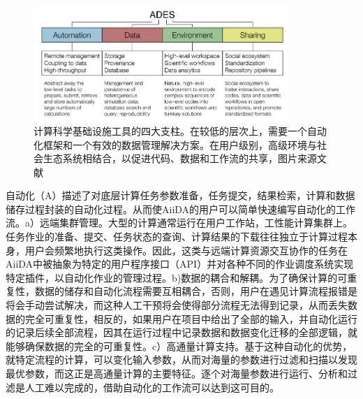 \begin{figure}
  \includegraphics[width=0.86\textwidth]{figs/ch3_ades.png}
  \centering
  \caption{计算科学基础设施工具的四大支柱。在较低的层次上，需要一个自动化框架和一个有效的数据管理解决方案。在用户级别，高级环境与社会生态系统相结合，以促进代码、数据和工作流的共享，图片来源文献\cite{pizzi2016aiida}}
  \label{fig:ch3_ades}
\end{figure}

自动化（A）描述了对底层计算任务参数准备，任务提交，结果检索，计算和数据储存过程封装的自动化过程。从而使AiiDA的用户可以简单快速编写自动化的工作流。a）远端集群管理。大型的计算通常运行在用户工作站，工性能计算集群上。任务作业的准备、提交、任务状态的查询、计算结果的下载往往独立于计算过程本身，用户会频繁地执行这类操作。因此，这类与远端计算资源交互协作的任务在AiiDA中被抽象为特定的用户程序接口（API）并对各种不同的作业调度系统实现特定插件，以自动化作业的管理过程。b)数据的耦合和解耦。为了确保计算的可重复性，数据的储存和自动化流程需要互相耦合，否则，用户在遇见计算流程报错是将会手动尝试解决，而这种人工干预将会使得部分流程无法得到记录，从而丢失数据的完全可重复性，相反的，如果用户在项目中给出了全部的输入，并自动化运行的记录后续全部流程，因其在运行过程中记录数据和数据变化迁移的全部逻辑，就能够确保数据的完全的可重复性。c）高通量计算支持。基于这种自动化的优势，就特定流程的计算，可以变化输入参数，从而对海量的参数进行过滤和扫描以发现最优参数，而这正是高通量计算的主要特征。逐个对海量参数进行运行、分析和过滤是人工难以完成的，借助自动化的工作流可以达到这可目的。

